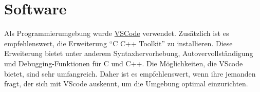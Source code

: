\chapter{Software}
\label{sec:reference:software}

Als Programmierumgebung wurde \href{https://code.visualstudio.com/}{VSCode} verwendet. Zusätzlich ist es empfehlenswert, die Erweiterung ``C C++ Toolkit'' zu installieren. Diese Erweiterung bietet unter anderem Syntaxhervorhebung, Autovervollständigung und Debugging-Funktionen für C und C++. Die Möglichkeiten, die VScode bietet, sind sehr umfangreich. Daher ist es empfehlenswert, wenn ihre jemanden fragt, der sich mit VScode auskennt, um die Umgebung optimal einzurichten.


